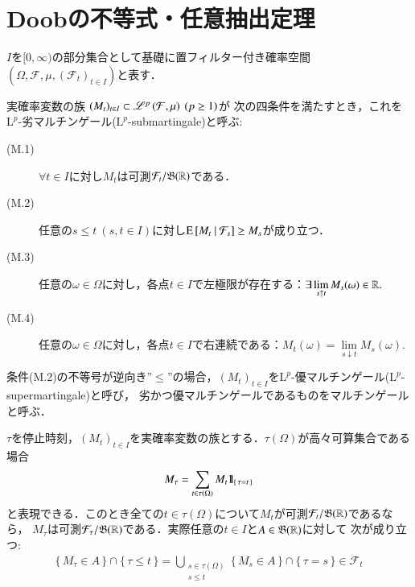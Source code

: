 \section{Doobの不等式・任意抽出定理}
	
	$I$を$[0,\infty)$の部分集合として基礎に置フィルター付き確率空間$(\Omega,\mathcal{F},\mu,(\mathcal{F}_t)_{t \in I})$と表す．
	
	\begin{screen}
		\begin{dfn}[マルチンゲール]
			実確率変数の族
			$(M_t)_{t \in I} \subset \mathscr{L}^{p} \left(\mathcal{F},\mu\right)\ (p \geq 1)$が
			次の四条件を満たすとき，これを$\mathrm{L}^p$-劣マルチンゲール($\mathrm{L}^p$-submartingale)と呼ぶ:
			\begin{description}
				\item[(M.1)] $\forall t \in I$に対し$M_t$は可測$\mathcal{F}_t/\mathfrak{B}(\mathbb{R})$である．
				\item[(M.2)] 任意の$s \leq t\ (s,t \in I)$に対し$\operatorname{E} \left[ M_t \ \middle|\ \mathcal{F}_s \right] \geq M_s$が成り立つ．
				\item[(M.3)] 任意の$\omega \in \Omega$に対し，各点$t \in I$で左極限が存在する：$\exists \lim\limits_{s \uparrow t} M_s(\omega) \in \mathbb{R}.$
				\item[(M.4)] 任意の$\omega \in \Omega$に対し，各点$t \in I$で右連続である：$M_t(\omega) = \lim\limits_{s \downarrow t} M_s(\omega).$
			\end{description}
			条件(M.2)の不等号が逆向き''$\leq$''の場合，$(M_t)_{t \in I}$を$\mathrm{L}^p$-優マルチンゲール($\mathrm{L}^p$-supermartingale)と呼び，
			劣かつ優マルチンゲールであるものをマルチンゲールと呼ぶ．
			\label{dfn:martingale}
		\end{dfn}
	\end{screen}
	
	$\tau$を停止時刻，$(M_t)_{t \in I}$を実確率変数の族とする．$\tau(\Omega)$が高々可算集合である場合
	\begin{align}
		M_\tau = \sum_{t \in \tau(\Omega)}M_t \mbox{1}\hspace{-0.25em}\mbox{l}_{\{\, \tau = t\, \}}
	\end{align}
	と表現できる．このとき全ての$t \in \tau(\Omega)$について$M_t$が可測$\mathcal{F}_t/\mathfrak{B}(\mathbb{R})$であるなら，
	$M_\tau$は可測$\mathcal{F}_\tau/\mathfrak{B}(\mathbb{R})$である．実際任意の$t \in I$と$A \in \mathfrak{B}(\mathbb{R})$に対して
	次が成り立つ:
	\begin{align}
		\{\, M_\tau \in A\, \} \cap \{\, \tau \leq t\, \}
		= \bigcup_{\substack{s \in \tau(\Omega) \\ s \leq t}}\{\, M_s \in A\, \} \cap \{\, \tau = s\, \} \in \mathcal{F}_t 
	\end{align}
	
